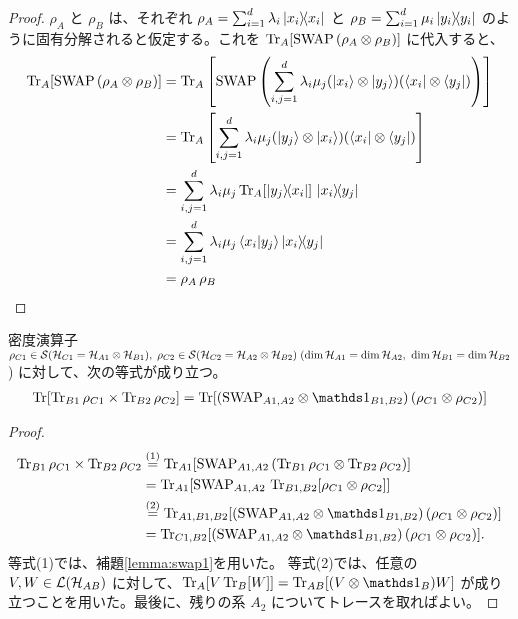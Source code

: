 \begin{proof}
    $\rho_A$ と $\rho_B$ は、それぞれ $\rho_A = \sum_{i=1}^d \lambda_i \dyad{x_i}$ と $\rho_B = \sum_{i=1}^d \mu_i \dyad{y_i}$ のように固有分解されると仮定する。これを $\Tr_A[\mathrm{SWAP}\,(\rho_A \otimes \rho_B)]$ に代入すると、
    \begin{align*}
        \Tr_A[\SWAP\,(\rho_A \ot \rho_B)]
        &= \Tr_A\qty[\SWAP\,\qty(\sum_{i,j=1}^d \lambda_i \mu_j (\kten{x_i}{y_j})(\bten{x_i}{y_j}))]\\
        &= \Tr_A\qty[\sum_{i,j=1}^d \lambda_i \mu_j (\kten{y_j}{x_i})(\bten{x_i}{y_j})]\\
        &= \sum_{i,j=1}^d \lambda_i \mu_j \Tr_A[\dyad{y_j}{x_i}]\,\dyad{x_i}{y_j}\\
        &= \sum_{i,j=1}^d \lambda_i \mu_j \braket{x_i}{y_j}\ketbra{x_i}{y_j}\\
        &= \rho_A\,\rho_B
    \end{align*}
\end{proof}


\begin{screen}
    \begin{lemma}\label{lemma:swap2}
        密度演算子 $\rho_{C1} \in \mathcal{S}(\mathcal{H}_{C1} = \mathcal{H}_{A1} \otimes \mathcal{H}_{B1}),\;\rho_{C2} \in \mathcal{S}(\mathcal{H}_{C2} = \mathcal{H}_{A2} \otimes \mathcal{H}_{B2}) \;(\dim\mathcal{H}_{A1} = \dim\mathcal{H}_{A2},\,\,\dim\mathcal{H}_{B1} = \dim\mathcal{H}_{B2}$) に対して、次の等式が成り立つ。
        \begin{align}
            \Tr[\Tr_{B1}\rho_{C1} \times \Tr_{B2}\rho_{C2}]
            = \Tr[(\SWAP_{A1,A2} \ot \bbid_{B1,B2})\,(\rho_{C1} \ot \rho_{C2})]
        \end{align}
    \end{lemma}
\end{screen}

\begin{proof}
    \begin{align*}
        \Tr_{B1}\rho_{C1} \times \Tr_{B2}\rho_{C2}
        &\overset{(1)}{=} \Tr_{A1}[\SWAP_{A1,A2}\,(\Tr_{B1}\rho_{C1} \ot \Tr_{B2}\rho_{C2})]\\
        &= \Tr_{A1}[\SWAP_{A1,A2}\,\Tr_{B1,B2}[\rho_{C1} \ot \rho_{C2}]]\\
        &\overset{(2)}{=} \Tr_{A1,B1,B2}[(\SWAP_{A1,A2} \ot \bbid_{B1,B2})\,(\rho_{C1} \ot \rho_{C2})]\\
        &= \Tr_{C1,B2}[(\SWAP_{A1,A2} \ot \bbid_{B1,B2})\,(\rho_{C1} \ot \rho_{C2})].
    \end{align*}
    等式(1)では、補題\ref{lemma:swap1}を用いた。
    等式(2)では、任意の $V,W \in \mathcal{L}(\mathcal{H}_{AB})$ に対して、$\Tr_A[V\Tr_B[W]] = \Tr_{AB}[(V \ot \bbid_B) W]$ が成り立つことを用いた。最後に、残りの系 $A_2$ についてトレースを取ればよい。
\end{proof}



